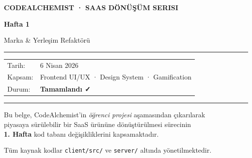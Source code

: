 \documentclass[12pt,a4paper]{article}
\begin{document}
\begin{titlepage}
  \pagecolor{slate900}
  \color{white}
  \centering
  \vspace*{3cm}

  {\fontsize{10}{12}\selectfont\color{indigo}\bfseries\MakeUppercase{CodeAlchemist · SaaS Dönüşüm Serisi}}

  \vspace{1.5cm}
  {\fontsize{36}{40}\selectfont\bfseries Hafta 1}

  \vspace{0.5cm}
  {\fontsize{18}{22}\selectfont\color{slate400} Marka \& Yerleşim Refaktörü}

  \vspace{1cm}
  \color{codeframe}\hrule
  \vspace{1cm}

  \begin{tabular}{ll}
    \color{slate400}Tarih:    & \color{white} 6 Nisan 2026 \\[4pt]
    \color{slate400}Kapsam:   & \color{white} Frontend UI/UX · Design System · Gamification \\[4pt]
    \color{slate400}Durum:    & \color{indigo}\bfseries Tamamlandı ✓ \\
  \end{tabular}

  \vspace{2cm}
  \color{codeframe}
  \rule{\textwidth}{0.4pt}
  \vspace{0.5cm}

  {\small\color{slate400} Bu belge, CodeAlchemist'in \textit{öğrenci projesi} aşamasından çıkarılarak\\
  piyasaya sürülebilir bir SaaS ürününe dönüştürülmesi sürecinin\\
  \textbf{1. Hafta} kod tabanı değişikliklerini kapsamaktadır.}

  \vfill
  {\footnotesize\color{slate700} Tüm kaynak kodlar \texttt{client/src/} ve \texttt{server/} altında yönetilmektedir.}
\end{titlepage}
\pagecolor{white}
\color{black}

\tableofcontents
\newpage

\end{document}
